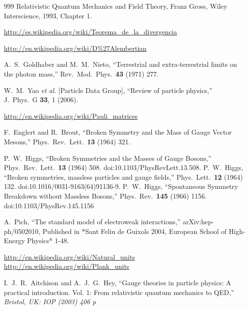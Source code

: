 \begin{thebibliography}{999}
Relativistic Quantum Mechanics and Field Theory, Franz Gross, Wiley Interscience, 1993, Chapter 1.

\url{http://es.wikipedia.org/wiki/Teorema_de_la_divergencia}

\url{http://en.wikipedia.org/wiki/D%27Alembertian}

  A.~S.~Goldhaber and M.~M.~Nieto,
  ``Terrestrial and extra-terrestrial limits on the photon mass,''
  Rev.\ Mod.\ Phys.\  {\bf 43} (1971) 277.

  W.~M.~Yao {\it et al.}  [Particle Data Group],
  ``Review of particle physics,''
  J.\ Phys.\ G {\bf 33}, 1 (2006).

\url{http://en.wikipedia.org/wiki/Pauli_matrices}

  F.~Englert and R.~Brout,
  ``Broken Symmetry and the Mass of Gauge Vector Mesons,''
  Phys.\ Rev.\ Lett.\  {\bf 13} (1964) 321.

  P.~W.~Higgs,
  ``Broken Symmetries and the Masses of Gauge Bosons,''
  Phys.\ Rev.\ Lett.\  {\bf 13} (1964) 508.
  doi:10.1103/PhysRevLett.13.508.
  P.~W.~Higgs,
  ``Broken symmetries, massless particles and gauge fields,''
  Phys.\ Lett.\  {\bf 12} (1964) 132.
  doi:10.1016/0031-9163(64)91136-9.
  P.~W.~Higgs,
  ``Spontaneous Symmetry Breakdown without Massless Bosons,''
  Phys.\ Rev.\  {\bf 145} (1966) 1156.
  doi:10.1103/PhysRev.145.1156



  A.~Pich,
  ``The standard model of electroweak interactions,''
  arXiv:hep-ph/0502010,
  Published in *Sant Feliu de Guixols 2004, European School of High-Energy Physics* 1-48.

\url{http://en.wikipedia.org/wiki/Natural_units}
\url{http://en.wikipedia.org/wiki/Plank_units}

  I.~J.~R.~Aitchison and A.~J.~G.~Hey,
  ``Gauge theories in particle physics: A practical introduction. Vol. 1: From
  relativistic quantum mechanics to QED,''
{\it  Bristol, UK: IOP (2003) 406 p}


\end{thebibliography}
